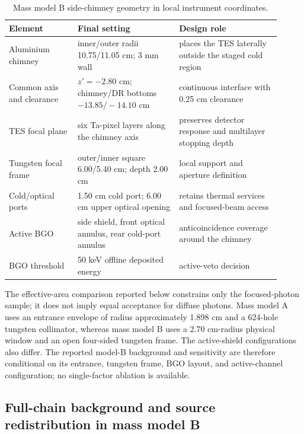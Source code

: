 \documentclass[11pt]{article}
\newcommand{\revblue}[1]{\textcolor{revisionblue}{#1}}
\begin{document}
\begin{table}[!ht]
\centering
\caption{Mass model B side-chimney geometry in local instrument coordinates.}
\label{tab:final_geometry}
\footnotesize
\begin{tabular}{p{0.23\linewidth}p{0.34\linewidth}p{0.34\linewidth}}
\toprule
Element & Final setting & Design role \\
\midrule
Aluminium chimney & inner/outer radii 10.75/11.05 cm; 3 mm wall & places the TES laterally outside the staged cold region \\
Common axis and clearance & $z'=-2.80$ cm; chimney/DR bottoms $-13.85/-14.10$ cm & continuous interface with 0.25 cm clearance \\
TES focal plane & six Ta-pixel layers along the chimney axis & preserves detector response and multilayer stopping depth \\
Tungsten focal frame & outer/inner square 6.00/5.40 cm; depth 2.00 cm & local support and aperture definition \\
Cold/optical ports & 1.50 cm cold port; 6.00 cm upper optical opening & retains thermal services and focused-beam access \\
Active BGO & side shield, front optical annulus, rear cold-port annulus & anticoincidence coverage around the chimney \\
BGO threshold & 50 keV offline deposited energy & active-veto decision \\
\bottomrule
\end{tabular}
\end{table}

\revblue{The effective-area comparison reported below constrains only the focused-photon sample}; it does not imply equal acceptance for diffuse photons. Mass model A uses an entrance envelope of radius approximately 1.898 cm and a 624-hole tungsten collimator, whereas mass model B uses a 2.70 cm-radius physical window and an open four-sided tungsten frame. The active-shield configurations also differ. The reported model-B background and sensitivity are therefore conditional on its entrance, tungsten frame, BGO layout, and active-channel configuration; no single-factor ablation is available.

\FloatBarrier

\subsection{Full-chain background and source redistribution in mass model B}
\label{subsec:optimized_fullchain}
\end{document}
